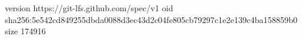 version https://git-lfs.github.com/spec/v1
oid sha256:5e542cd849255dbda0088d3ec43d2c04fe805cb79297c1e2e139c4ba158859b0
size 174916
